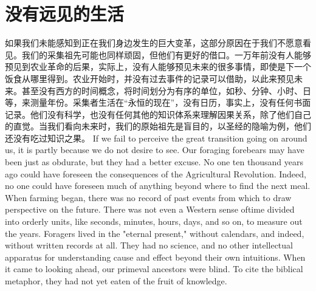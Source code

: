 \section{没有远见的生活}

\begin{paracol}{2}
如果我们未能感知到正在我们身边发生的巨大变革，这部分原因在于我们不愿意看见。我们的采集祖先可能也同样顽固，但他们有更好的借口。一万年前没有人能够预见到农业革命的后果，实际上，没有人能够预见未来的很多事情，即使是下一个饭食从哪里得到。农业开始时，并没有过去事件的记录可以借助，以此来预见未来。甚至没有西方的时间概念，将时间划分为有序的单位，如秒、分钟、小时、日等，来测量年份。采集者生活在“永恒的现在”，没有日历，事实上，没有任何书面记录。他们没有科学，也没有任何其他的知识体系来理解因果关系，除了他们自己的直觉。当我们看向未来时，我们的原始祖先是盲目的，以圣经的隐喻为例，他们还没有吃过知识之果。
\switchcolumn
If we fail to perceive the great transition going on around us, it is partly because we do not desire to see. Our foraging forebears may have been just as obdurate, but they had a better excuse. No one ten thousand years ago could have foreseen the consequences of the Agricultural Revolution. Indeed, no one could have foreseen much of anything beyond where to find the next meal. When farming began, there was no record of past events from which to draw perspective on the future. There was not even a Western sense oftime divided into orderly units, like seconds, minutes, hours, days, and so on, to measure out the years. Foragers lived in the "eternal present," without calendars, and indeed, without written records at all. They had no science, and no other intellectual apparatus for understanding cause and effect beyond their own intuitions. When it came to looking ahead, our primeval ancestors were blind. To cite the biblical metaphor, they had not yet eaten of the fruit of knowledge.    
\end{paracol}

